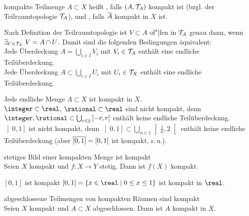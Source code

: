 \linie

\begin{Def}{kompakte Teilmenge}
    $A \subset X$ heißt , falls $(A, \mathcal{T}_A)$
    kompakt ist (bzgl. der Teilraumtopologie $\mathcal{T}_A$),
    und , falls $\overline{A}$ kompakt in $X$
    ist.
\end{Def}

\begin{Bem}
    Nach Definition der Teilraumtopologie ist $V \subset A$ of"|fen in $\mathcal{T}_A$
    genau dann, wenn $\exists_{U \in \mathcal{T}_X}\; V = A \cap U$.
    Damit sind die folgenden Bedingungen äquivalent: \\
    Jede Überdeckung $A = \bigcup_{i \in I} V_i$ mit $V_i \in \mathcal{T}_A$
    enthält eine endliche Teilüberdeckung. \\
    Jede Überdeckung $A \subset \bigcup_{i \in I} U_i$ mit $U_i \in \mathcal{T}_X$
    enthält eine endliche Teilüberdeckung.
\end{Bem}

\begin{Bsp}
    Jede endliche Menge $A \subset X$ ist kompakt in $X$. \\
    $\integer \subset \real$, $\rational \subset \real$ sind nicht kompakt,
    denn
    $\integer, \rational \subset \bigcup_{r \in \natural} \left]-r, r\right[$
    enthält keine endliche Teilüberdeckung.
    $\left]0, 1\right]$ ist nicht kompakt, denn
    $\left]0, 1\right] \subset
    \bigcup_{n \in \natural} \left]\frac{1}{n}, 2\right[$
    enthält keine endliche Teilüberdeckung
    (aber $\overline{\left]0, 1\right]} = [0, 1]$ ist kompakt, s.\,u.).
\end{Bsp}

\linie

\begin{Satz}{stetiges Bild einer kompakten Menge ist kompakt}\\
    Seien $X$ kompakt und $f\colon X \rightarrow Y$ stetig.
    Dann ist $f(X)$ kompakt.
\end{Satz}

\linie

\begin{Satz}{$[0, 1]$ ist kompakt}
    $[0, 1] = \{x \in \real \;|\; 0 \le x \le 1\}$ ist kompakt in $\real$.
\end{Satz}

\linie
\pagebreak

\begin{Satz}{abgeschlossene Teilmengen von kompakten Räumen sind kompakt}\\
    Seien $X$ kompakt und $A \subset X$ abgeschlossen.
    Dann ist $A$ kompakt in $X$.
\end{Satz}

